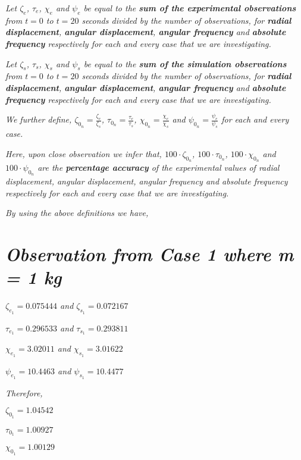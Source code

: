\textit{Let $\zeta_e$, $\tau_e$, $\chi_e$ and $\psi_e$ be equal to the \textbf{sum of the experimental observations} from $t = 0$ to $t = 20$ seconds divided by the number of observations, for \textbf{radial displacement}, \textbf{angular displacement}, \textbf{angular frequency} and \textbf{absolute frequency} respectively for each and every case that we are investigating.} 

\textit{Let $\zeta_s$, $\tau_s$, $\chi_s$ and $\psi_s$ be equal to the \textbf{sum of the simulation observations} from $t = 0$ to $t = 20$ seconds divided by the number of observations, for \textbf{radial displacement}, \textbf{angular displacement}, \textbf{angular frequency} and \textbf{absolute frequency} respectively for each and every case that we are investigating.}

\textit{We further define, $\zeta_{0_n} = \frac{\zeta_e}{\zeta_s}$, $\tau_{0_n} = \frac{\tau_e}{\tau_s}$, $\chi_{0_n} = \frac{\chi_e}{\chi_s}$ and $\psi_{0_n} = \frac{\psi_e}{\psi_s}$ for each and every case.}

\textit{Here, upon close observation we infer that, $100\cdot\zeta_{0_n}$, $100\cdot\tau_{0_n}$, $100\cdot\chi_{0_n}$ and $100\cdot\psi_{0_n}$ are the \textbf{percentage accuracy} of the experimental values of radial displacement, angular displacement, angular frequency and absolute frequency respectively for each and every case that we are investigating.}

\textit{By using the above definitions we have,}

\section{\textit{Observation from Case 1 where m = 1 kg}}
        
    \textit{$\zeta_{e_1} = 0.075444$ and $\zeta_{s_1} = 0.072167$}
            
    \textit{$\tau_{e_1} = 0.296533$ and $\tau_{s_1} = 0.293811$}
            
    \textit{$\chi_{e_1} = 3.02011$ and $\chi_{s_1} = 3.01622$}
            
    \textit{$\psi_{e_1} = 10.4463$ and $\psi_{s_1} = 10.4477$}
            
    \textit{Therefore,}
            
    $\zeta_{0_1} = 1.04542$
            
    $\tau_{0_1} = 1.00927$
            
    $\chi_{0_1} = 1.00129$
            
